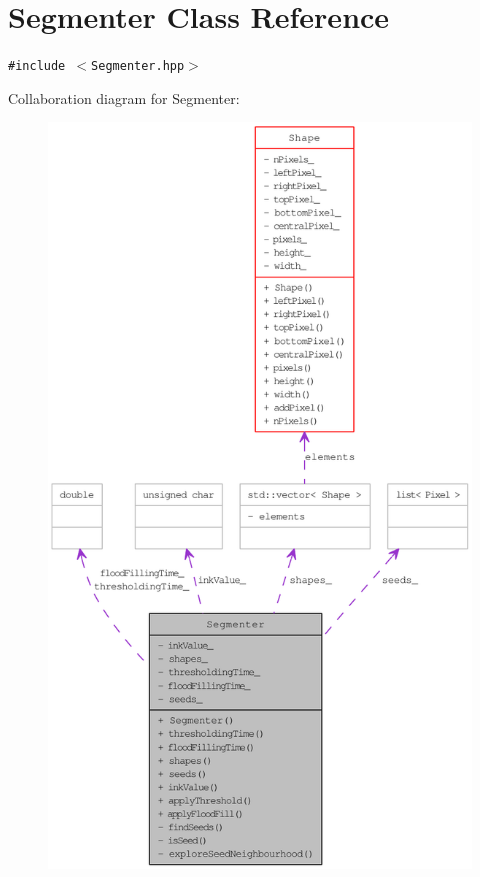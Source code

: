 \hypertarget{class_segmenter}{
\section{Segmenter Class Reference}
\label{class_segmenter}
}
{\tt \#include $<$Segmenter.hpp$>$}

Collaboration diagram for Segmenter:\nopagebreak
\begin{figure}[H]
\begin{center}
\leavevmode
\includegraphics[width=400pt]{class_segmenter__coll__graph}
\end{center}
\end{figure}


